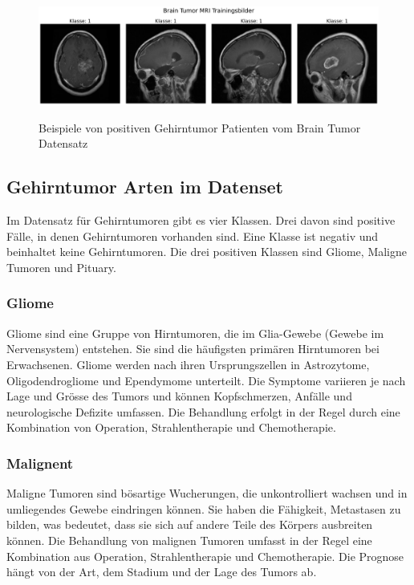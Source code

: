 \begin{figure}[ht]
    \centering
    \includegraphics[width=\linewidth, height=4cm]{01-images/03-data/brain-klasse1.png}
    \caption{Beispiele von positiven Gehirntumor Patienten vom Brain Tumor Datensatz}
    \label{fig:brain-klasse1}
\end{figure}


\subsection{Gehirntumor Arten im Datenset}
Im Datensatz für Gehirntumoren gibt es vier Klassen. Drei davon sind positive Fälle, in denen Gehirntumoren vorhanden sind. Eine Klasse ist negativ und beinhaltet keine Gehirntumoren. Die drei positiven Klassen sind Gliome, Maligne Tumoren und Pituary.


\subsubsection{Gliome}
Gliome sind eine Gruppe von Hirntumoren, die im Glia-Gewebe (Gewebe im Nervensystem) entstehen. Sie sind die häufigsten primären Hirntumoren bei Erwachsenen. Gliome werden nach ihren Ursprungszellen in Astrozytome, Oligodendrogliome und Ependymome unterteilt. Die Symptome variieren je nach Lage und Grösse des Tumors und können Kopfschmerzen, Anfälle und neurologische Defizite umfassen. Die Behandlung erfolgt in der Regel durch eine Kombination von Operation, Strahlentherapie und Chemotherapie.

\subsubsection{Malignent}
Maligne Tumoren sind bösartige Wucherungen, die unkontrolliert wachsen und in umliegendes Gewebe eindringen können. Sie haben die Fähigkeit, Metastasen zu bilden, was bedeutet, dass sie sich auf andere Teile des Körpers ausbreiten können. Die Behandlung von malignen Tumoren umfasst in der Regel eine Kombination aus Operation, Strahlentherapie und Chemotherapie. Die Prognose hängt von der Art, dem Stadium und der Lage des Tumors ab.

